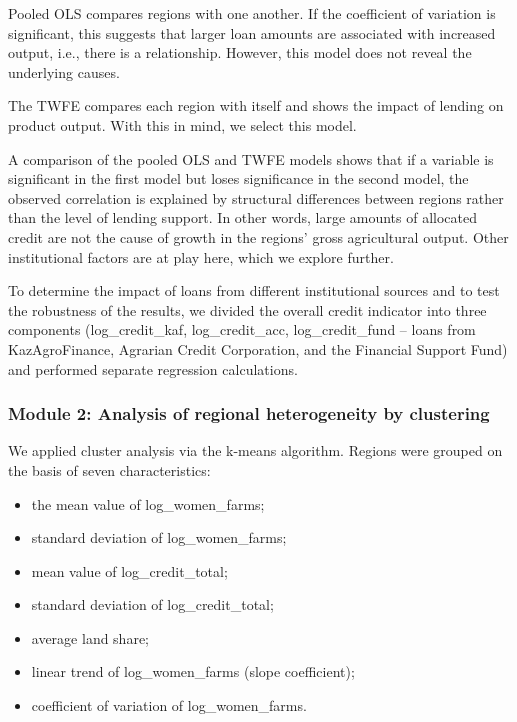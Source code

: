 ﻿\documentclass[pdflatex,sn-mathphys-ay]{sn-jnl}
\begin{document}
Pooled OLS compares regions with one another. If the coefficient of
variation is significant, this suggests that larger loan amounts are
associated with increased output, i.e., there is a relationship.
However, this model does not reveal the underlying causes.

The TWFE compares each region with itself and shows the impact of
lending on product output. With this in mind, we select this model.

A comparison of the pooled OLS and TWFE models shows that if a variable
is significant in the first model but loses significance in the second
model, the observed correlation is explained by structural differences
between regions rather than the level of lending support. In other
words, large amounts of allocated credit are not the cause of growth in the regions'
gross agricultural output. Other institutional factors are at play here,
which we explore further.

To determine the impact of loans from different institutional sources
and to test the robustness of the results, we divided the overall credit
indicator into three components (log\_credit\_kaf, log\_credit\_acc,
log\_credit\_fund -- loans from KazAgroFinance, Agrarian Credit
Corporation, and the Financial Support Fund) and performed separate
regression calculations.

\subsubsection{Module 2: Analysis of regional heterogeneity by clustering}

We applied cluster analysis via the k-means algorithm. Regions were
grouped on the basis of seven characteristics:

\begin{itemize}
\item the mean value of log\_women\_farms;
\item standard deviation of log\_women\_farms;
\item mean value of log\_credit\_total;
\item standard deviation of log\_credit\_total;
\item average land share;
\item linear trend of log\_women\_farms (slope coefficient);
\item coefficient of variation of log\_women\_farms.
\end{itemize}
\end{document}
